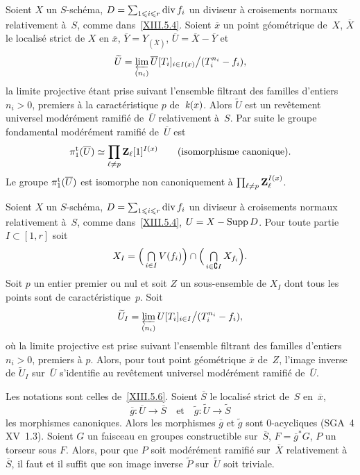 \begin{corollaire}
\label{XIII.5.6}
Soient $X$ un $S$-sch\'ema, $D=\sum_{1\leqslant i\leqslant
r}\operatorname{\mathrm{div}} f_{i}$ un diviseur \`a croisements normaux relativement
\`a~$S$, comme dans~\ref{XIII.5.4}. Soient $\overline{x}$ un point
g\'eom\'etrique de~$X$, $\overline{X}$ le localis\'e strict de
$X$ en $\overline{x}$, $\overline{Y}=Y_{(\overline{X})}$,
$\overline{U}=\overline{X}-\overline{Y}$ et
$$
\widetilde{U}= \varprojlim_{(n_{i})}
\overline{U}[T_{i}]_{i\in I(x)}\big/ (T_{i}^{n_{i}}-f_{i}) ,
$$
la limite projective \'etant prise suivant l'ensemble filtrant des
familles d'entiers $n_{i}>0$, premiers \`a la caract\'eristique
$p$ de~$\mathit{k}(x)$. Alors $\widetilde{U}$ est un rev\^etement universel
mod\'er\'ement ramifi\'e de~$\overline{U}$ relativement \`a~$S$. Par suite le groupe fondamental mod\'er\'ement ramifi\'e
de~$\overline{U}$ est
$$
\pi_{1}^{\mathrm{t}}(\overline{U})\simeq \prod_{\ell\neq
p}\mathbf{Z}_{\ell}[1]^{I(x)} \qquad \textrm{(isomorphisme canonique).}
$$
Le groupe $\pi_{1}^{\mathrm{t}}(\overline{U})$ est isomorphe non
canoniquement \`a $\prod_{\ell\neq p}\mathbf{Z}_{\ell}^{I(x)}$.
\end{corollaire}

\begin{subremarque}
\label{XIII.5.6.1}
Soient $X$ un $S$-sch\'ema, $D=\sum_{1\leqslant i\leqslant
r}\operatorname{\mathrm{div}} f_{i}$ un diviseur \`a croisements normaux relativement
\`a~$S$, comme dans~\ref{XIII.5.4}, $U=X-\operatorname{Supp} D$.
Pour toute partie $I\subset[1,r]$ soit
$$
X_{I}= \Big(\mathop{\textstyle\bigcap}\limits_{i\in I}V(f_{i})\Big) \cap \Big(\mathop{\textstyle\bigcap}\limits_{i\in\complement
I}X_{f_{i}}\Big) .
$$
Soit $p$ un entier premier ou nul et soit $Z$ un sous-ensemble de
$X_{I}$ dont tous les points sont de caract\'eristique~$p$. Soit
$$
\widetilde{U}_{I}= \varprojlim_{(n_{i})}
U[T_{i}]_{i\in I}
\big/ (T_{i}^{n_{i}}-f_{i}) ,
$$
o\`u
la limite projective est prise suivant l'ensemble filtrant des
familles d'entiers $n_{i}>0$, premiers \`a $p$. Alors, pour tout
point g\'eom\'etrique $\overline{x}$ de~$Z$, l'image inverse de
$\widetilde{U}_{I}$ sur~$\overline{U}$ s'identifie au rev\^etement
universel mod\'er\'ement ramifi\'e de~$\overline{U}$.
\end{subremarque}

\begin{corollaire}
\label{XIII.5.7}
Les notations sont celles de~\ref{XIII.5.6}. Soient $\overline{S}$ le
localis\'e strict de~$S$ en~$\overline{x}$,
$$
\overline{g}\colon\overline{U}\to\overline{S} \quad \text{et} \quad
\tilde{g}\colon\widetilde{U}\to\widetilde{S}
$$
les morphismes canoniques. Alors les morphismes $\overline{g}$ et
$\tilde g$ sont $0$-acycliques \textup{(SGA~4 XV~1.3)}. Soient $G$ un faisceau
en groupes constructible sur~$\overline{S}$, $F=\overline{g}^*G$, $P$
un torseur sous $F$. Alors, pour que $P$ soit mod\'er\'ement
ramifi\'e sur~$\overline{X}$ relativement \`a $\overline{S}$, il
faut et il suffit que son image inverse $\widetilde{P}$ sur~$\widetilde{U}$ soit triviale.
\end{corollaire}

